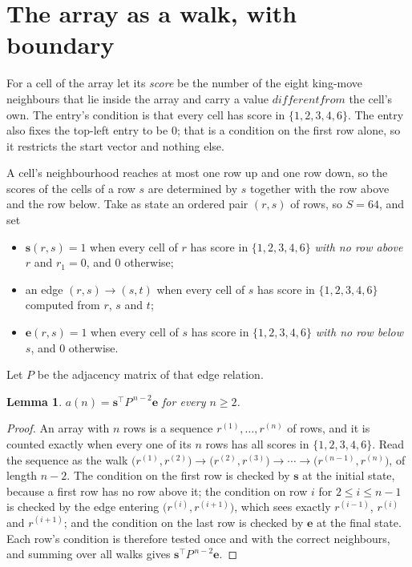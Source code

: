 \documentclass[11pt,a4paper]{article}
\theoremstyle{plain}
\newtheorem{lemma}[theorem]{Lemma}
\theoremstyle{definition}
\begin{document}
\section{The array as a walk, with boundary}

For a cell of the array let its \emph{score} be the number of the eight king-move neighbours that lie inside
the array and carry a value $different from$ the cell's own. The entry's condition is that every cell
has score in $\{1,2,3,4,6\}$. The entry also fixes the top-left entry to be $0$; that is a condition on the first row alone, so it restricts the start vector and nothing else.

A cell's neighbourhood reaches at most one row up and one row down, so the scores of the
cells of a row $s$ are determined by $s$ together with the row above and the row below.
Take as state an ordered pair $(r,s)$ of rows, so $S=64$, and set
\begin{itemize}
\item $\mathbf{s}(r,s)=1$ when every cell of $r$ has score in $\{1,2,3,4,6\}$ \emph{with no row
above $r$} and $r_1=0$, and $0$ otherwise;
\item an edge $(r,s)\to(s,t)$ when every cell of $s$ has score in $\{1,2,3,4,6\}$ computed from
$r$, $s$ and $t$;
\item $\mathbf{e}(r,s)=1$ when every cell of $s$ has score in $\{1,2,3,4,6\}$ \emph{with no row
below $s$}, and $0$ otherwise.
\end{itemize}
Let $P$ be the adjacency matrix of that edge relation.

\begin{lemma}\label{lem:walk}
$a(n)=\mathbf{s}^{\!\top}P^{\,n-2}\mathbf{e}$ for every $n\ge2$.
\end{lemma}

\begin{proof}
An array with $n$ rows is a sequence $r^{(1)},\dots,r^{(n)}$ of rows, and it is counted
exactly when every one of its $n$ rows has all scores in $\{1,2,3,4,6\}$. Read the sequence as the
walk $\bigl(r^{(1)},r^{(2)}\bigr)\to\bigl(r^{(2)},r^{(3)}\bigr)\to\cdots\to
\bigl(r^{(n-1)},r^{(n)}\bigr)$, of length $n-2$. The condition on the first row is
checked by $\mathbf{s}$ at the initial state, because a first row has no row above it; the
condition on row $i$ for $2\le i\le n-1$ is checked by the edge entering
$\bigl(r^{(i)},r^{(i+1)}\bigr)$, which sees exactly $r^{(i-1)}$, $r^{(i)}$ and
$r^{(i+1)}$; and the condition on the last row is checked by $\mathbf{e}$ at the final
state. Each row's condition is therefore tested once and with the correct neighbours, and
summing over all walks gives $\mathbf{s}^{\!\top}P^{\,n-2}\mathbf{e}$.
\end{proof}
\end{document}
